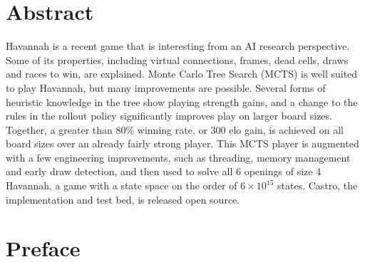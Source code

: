 
  \newpage
  \chapter*{Abstract}
  \thispagestyle{empty}
  \vspace*{-0.7in}
  \renewcommand{\baselinestretch}{1.8}
  \normalsize{

Havannah is a recent game that is interesting from an AI research perspective. Some of its properties, including virtual connections, frames, dead cells, draws and races to win, are explained. Monte Carlo Tree Search (MCTS) is well suited to play Havannah, but many improvements are possible. Several forms of heuristic knowledge in the tree show playing strength gains, and a change to the rules in the rollout policy significantly improves play on larger board sizes. Together, a greater than 80\% winning rate, or 300 elo gain, is achieved on all board sizes over an already fairly strong player. This MCTS player is augmented with a few engineering improvements, such as threading, memory management and early draw detection, and then used to solve all 6 openings of size 4 Havannah, a game with a state space on the order of $6 \times 10^{15}$ states. Castro, the implementation and test bed, is released open source.

  }

  \renewcommand{\baselinestretch}{1.33}

  \newpage
  \chapter*{Preface}
  \thispagestyle{empty}
  \vspace*{-0.7in}

